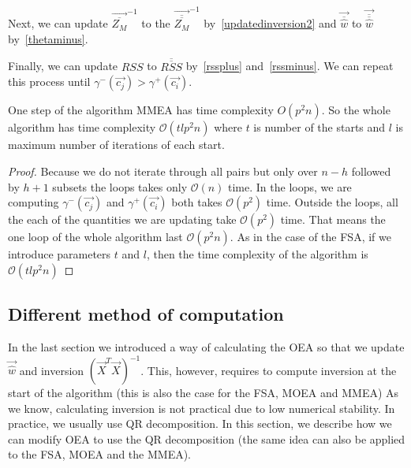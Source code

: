 Next, we can update $\vec{\overline{Z_M}}^{-1}$ to the   $\vec{\overline{\overline{Z_M}}}^{-1}$ by~\eqref{updatedinversion2} and 
$\vec{\overline{\hat{w}}}$ to $\vec{\overline{\overline{\hat{w}}}}$ by~\eqref{thetaminus}.

Finally, we can update $RSS$ to $\overline{\overline{RSS}}$ by~\eqref{rssplus} and~\eqref{rssminus}. We can repeat this process until $\gamma^{-}(\vec{c_j}) > \gamma^{+}(\vec{c_i})$.

\begin{observation} \label{timecomplexitymmea}
    One step of the algorithm MMEA has time complexity $O(p^2n)$. So the whole algorithm has time complexity $\mathcal{O}(tlp^2n)$ where $t$ is number of the starts and $l$ is maximum number of iterations of each start.
\end{observation}

\begin{proof}
    Because we do not iterate through all pairs but only over $n-h$ followed by $h+1$ subsets the loops takes only $\mathcal{O}(n)$ time. In the loops, we are computing $\gamma^{-}(\vec{c_j}) $ and $\gamma^{+}(\vec{c_i})$ both takes $\mathcal{O}(p^2)$ time. Outside the loops, all the each of the quantities we are updating take $\mathcal{O}(p^2)$ time.
That means the one loop of the whole algorithm last $\mathcal{O}(p^2n)$.
As in the case of the FSA, if we introduce parameters $t$ and $l$, then the time complexity of the algorithm is $\mathcal{O}(tlp^2n)$
\end{proof}








\subsection{Different method of computation} \label{differentcomputation}
In the last section we introduced a way of calculating the OEA so that we update $\vec{\hat{w}}$ and inversion $(\vec{X}^T \vec{X})^{-1}$. This, however, requires to compute inversion at the start of the algorithm (this is also the case for the FSA, MOEA and MMEA) As we know, calculating inversion is not practical due to low numerical stability. In practice, we usually use QR decomposition. In this section, we describe how we can modify OEA to use the QR decomposition (the same idea can also be applied to the FSA, MOEA and the MMEA). 


